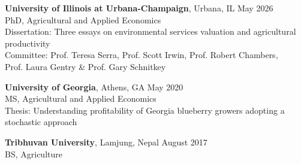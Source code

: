 
\textbf{University of Illinois at Urbana-Champaign}, Urbana, IL \hfill  May 2026\\
PhD, Agricultural and Applied Economics \\
Dissertation: Three essays on environmental services valuation and agricultural productivity\\
Committee: Prof. Teresa Serra, Prof. Scott Irwin, Prof. Robert Chambers, \\Prof. Laura Gentry \& Prof. Gary Schnitkey

\textbf{University of Georgia}, Athens, GA \hfill May 2020\\
MS, Agricultural and Applied Economics\\
Thesis: Understanding profitability of Georgia blueberry growers adopting a stochastic approach

\textbf{Tribhuvan University}, Lamjung, Nepal \hfill August 2017\\
BS, Agriculture